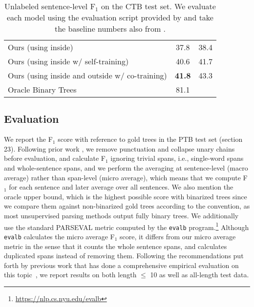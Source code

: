 \documentclass[11pt]{article}
\newcommand{\ptb}{\textsc{PTB}}
\begin{document}
\begin{table}[t]
{\begin{tabular}{lcc}
    \multicolumn{1}{l}{Ours (using inside)} & \cellcolor{pearDark!20}37.8 & \cellcolor{pearDark!20}38.4 \\
    \multicolumn{1}{l}{Ours (using inside w/ self-training)} & \cellcolor{pearDark!20}40.6 & \cellcolor{pearDark!20}41.7 \\
    \multicolumn{1}{l}{Ours (using inside and outside w/ co-training)} & \cellcolor{pearDark!20}\textbf{41.8} & \cellcolor{pearDark!20}43.3  \\
    \midrule
    \multicolumn{1}{l}{Oracle Binary Trees} & 81.1 & \\
    \bottomrule
    \end{tabular}
    }
    \caption[Results on the CTB test set]{Unlabeled sentence-level F$_1$ on the CTB test set. We evaluate each model using the evaluation script provided by \citet{kim-etal-2019-compound} and take the baseline numbers also from \citet{kim-etal-2019-compound}.}
    \label{tab:ctb-results}
\end{table} 
\subsection{Evaluation}
\label{ssec:evaluation}
We report the F$_1$ score with reference to gold trees in the \ptb{} test set (section 23). Following prior work \citep{kim-etal-2019-compound, shen2018neural, shen2018ordered, cao-etal-2020-unsupervised}, we remove punctuation and collapse unary chains before evaluation, and calculate F$_1$ ignoring trivial spans, i.e., single-word spans and whole-sentence spans, and we perform the averaging at sentence-level (macro average) rather than span-level (micro average), which means that we compute F$_1$ for each sentence and later average over all sentences. We also mention the oracle upper bound, which is the highest possible score with binarized trees since we compare them against non-binarized gold trees according to the convention, as most unsupervised parsing methods output fully binary trees. We additionally use the standard PARSEVAL metric computed by the \texttt{evalb} program.\footnote{\url{https://nlp.cs.nyu.edu/evalb}} Although \texttt{evalb} calculates the micro average F$_1$ score, it differs from our micro average metric in the sense that it counts the whole sentence spans, and calculates duplicated spans instead of removing them. Following the recommendations put forth by previous work that has done a comprehensive empirical evaluation on this topic~\citep{li-etal-2020-empirical}, we report results on both length $\leq$ 10 as well as all-length test data.
\end{document}
